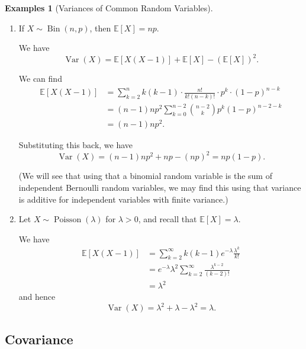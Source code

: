 \documentclass[11pt]{article}
\numberwithin{equation}{section}
\theoremstyle{definition}
\newtheorem{examples}[theorem]{Examples}
\theoremstyle{remark}
\newcommand{\pqty}[1]{\left(#1\right)}
\newcommand{\bqty}[1]{\left[#1\right]}
\newcommand{\Expt}{\mathbb E}
\DeclareMathOperator{\Var}{Var}
\newcommand{\Binomial}{\operatorname{Bin}}
\newcommand{\Poisson}{\operatorname{Poisson}}
\begin{document}
\begin{examples}[Variances of Common Random Variables]\label{probability-examples-002}
    \label{probability-ex:variance-rv}%
    \begin{enumerate}
        \item If \(X \sim \Binomial\pqty{n, p}\), then \(\Expt\bqty{X} = np\).
        
        We have
        \[
            \Var\pqty{X} = \Expt\bqty{X\pqty{X - 1}} + \Expt\bqty{X} - \pqty{\Expt\bqty{X}}^2.
        \]

        We can find
        \begin{align*}
            \Expt\bqty{X \pqty{X - 1}} &= \sum_{k = 2}^{n} k\pqty{k - 1} \cdot \frac{n!}{k! \pqty{n - k}!} \cdot p^k \cdot \pqty{1 - p}^{n - k} \\
            &= \pqty{n - 1} n p^2 \sum_{k = 0}^{n - 2} \binom{n - 2}{k} p^k \pqty{1 - p}^{n - 2 - k} \\
            &= \pqty{n - 1} n p^2.
        \end{align*}

        Substituting this back, we have
        \[
            \Var\pqty{X} = \pqty{n - 1} np^2 + np - \pqty{np}^2 = np \pqty{1 - p}.
        \]

        (We will see that using that a binomial random variable is the sum of independent Bernoulli random variables, we may find this using that variance is additive for independent variables with finite variance.)

        \item Let \(X \sim \Poisson\pqty{\lambda}\) for \(\lambda > 0\), and recall that \(\Expt\bqty{X} = \lambda\).
        
        We have
        \begin{align*}
            \Expt\bqty{X \pqty{X - 1}} &= \sum_{k = 2}^{\infty} k \pqty{k - 1} e^{-\lambda} \frac{\lambda^k}{k!} \\
            &= e^{-\lambda} \lambda^2 \sum_{k = 2}^{\infty} \frac{\lambda^{k - 2}}{\pqty{k - 2}!} \\
            &= \lambda^2
        \end{align*}
        and hence
        \[
            \Var\pqty{X} = \lambda^2 + \lambda - \lambda^2 = \lambda.
        \]
    \end{enumerate}
\end{examples}

\subsection{Covariance}
\end{document}
